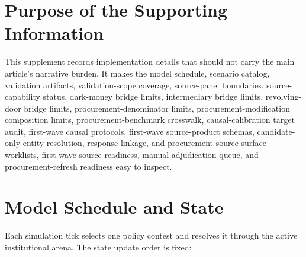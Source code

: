 \section{Purpose of the Supporting Information}

This supplement records implementation details that should not carry the main article's narrative burden. It makes the model schedule, scenario catalog, validation artifacts, validation-scope coverage, source-panel boundaries, source-capability status, dark-money bridge limits, intermediary bridge limits, revolving-door bridge limits, procurement-denominator limits, procurement-modification composition limits, procurement-benchmark crosswalk, causal-calibration target audit, first-wave causal protocols, first-wave source-product schemas, candidate-only entity-resolution, response-linkage, and procurement source-surface worklists, first-wave source readiness, manual adjudication queue, and procurement-refresh readiness easy to inspect.

\section{Model Schedule and State}

Each simulation tick selects one policy contest and resolves it through the active institutional arena. The state update order is fixed:

